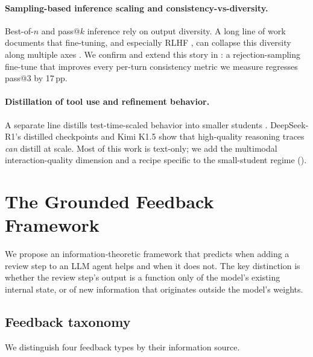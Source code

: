 \documentclass[11pt]{article}
\begin{document}
\paragraph{Sampling-based inference scaling and consistency-vs-diversity.} Best-of-$n$ and pass@$k$ inference \citep{chen2021evaluating,brown2024large} rely on output diversity. A long line of work documents that fine-tuning, and especially RLHF \citep{stiennon2020learning,casper2023open}, can collapse this diversity along multiple axes \citep{kirk2024diversity,padmakumar2024writing}. We confirm and extend this story in : a rejection-sampling fine-tune that improves every per-turn consistency metric we measure regresses pass@3 by 17\,pp.

\paragraph{Distillation of tool use and refinement behavior.} A separate line distills test-time-scaled behavior into smaller students \citep{magister2023teaching,ho2023largelm,fu2023specializing}. DeepSeek-R1's distilled checkpoints \citep{deepseek2025r1} and Kimi K1.5 \citep{kimi2025k15} show that high-quality reasoning traces \emph{can} distill at scale. Most of this work is text-only; we add the multimodal interaction-quality dimension and a recipe specific to the small-student regime ().

\section{The Grounded Feedback Framework}
\label{sec:framework}

We propose an information-theoretic framework that predicts when adding a review step to an LLM agent helps and when it does not. The key distinction is whether the review step's output is a function only of the model's existing internal state, or of new information that originates outside the model's weights.

\subsection{Feedback taxonomy}
\label{sec:taxonomy}

We distinguish four feedback types by their information source.
\end{document}
